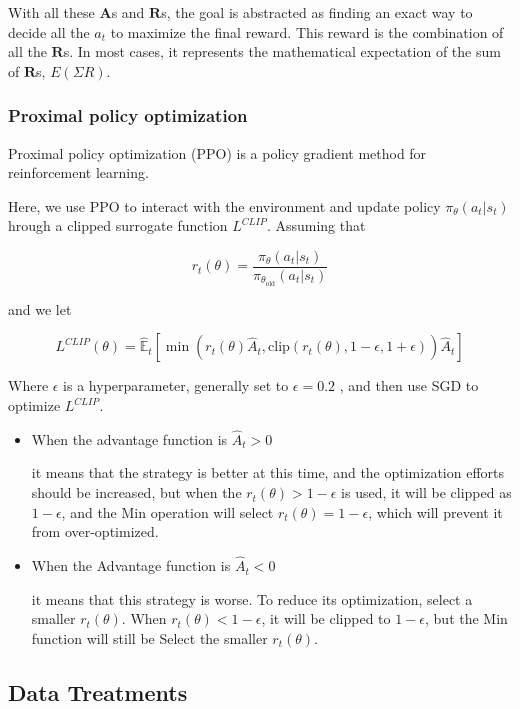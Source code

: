 \documentclass{mcmthesis}
\begin{document}
With all these $\pmb{A}$s and $\pmb{R}$s,
the goal is abstracted as finding an exact way to decide all the $a_t$
to maximize the final reward.
This reward is the combination of all the $\pmb{R}$s.
In most cases, it represents the mathematical expectation of the sum of $\pmb{R}$s,
$E(\Sigma R)$.

\subsubsection{Proximal policy optimization}

Proximal policy optimization (PPO) is a policy gradient method for reinforcement learning.

Here, we use PPO to interact with the environment and update policy $\pi_\theta(a_t | s_t)$ hrough a clipped surrogate function $L^{CLIP}$. Assuming that

\[
r_t(\theta) = \frac{\pi_{\theta}(a_t | s_t)}{\pi_{\theta_{\mathrm{old}}}(a_t | s_t)}
\]

and we let

\[
  L^{CLIP}(\theta) = \hat{\mathbb{E}}_t \left[ \min \left(r_t(\theta) \hat{A}_t, \mathrm{clip}(r_t(\theta), 1 - \epsilon, 1 + \epsilon)\right) \hat{A}_t \right]
\]

Where $\epsilon$ is a hyperparameter, generally set to $\epsilon = 0.2$ , and then use SGD to optimize $L^{CLIP}$.

\begin{itemize}
  \item When the advantage function is $\hat{A}_t > 0$ \par
  it means that the strategy is better at this time, and the optimization efforts should be increased, but when the $r_t(\theta) > 1 - \epsilon$ is used, it will be clipped as $1 - \epsilon$, and the Min operation will select $r_t(\theta) = 1 - \epsilon$, which will prevent it from over-optimized.
  \item When the Advantage function is $\hat{A}_t < 0$ \par
  it means that this strategy is worse. To reduce its optimization, select a smaller $r_t(\theta)$. When $r_t(\theta) < 1 - \epsilon$, it will be clipped to $1 - \epsilon$, but the Min function will still be Select the smaller $r_t(\theta)$.

\end{itemize}

\subsection{Data Treatments}
\end{document}
